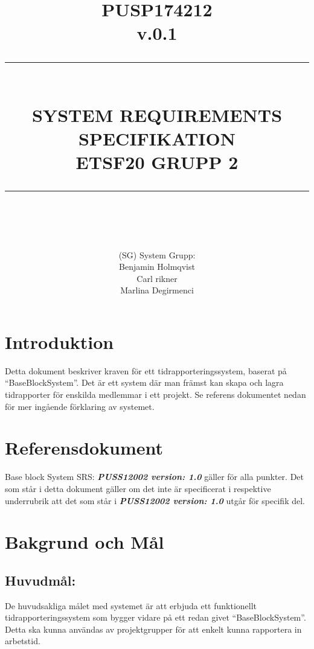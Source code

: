 \documentclass[paper=a4, fontsize=11pt,twoside]{article}
\title{ 														%
		\documentNumber{#1}											%
		\documentVersion{#2}											%
		\HRule{0.5pt} \\ %
		\LARGE \textbf{\uppercase{#3}} \\  									%
		\large \textbf{\uppercase{ETSF20 Grupp 2}}							%
		\HRule{2pt} \\ [0.5cm]      	%
		\normalsize          		%
	}															%
\author{#4}													%
\date{}                                           	%
\newcommand{\HRule}[1]{\rule{\linewidth}{#1}}   							%
\newcommand{\documentNumber}[1]{\centering PUSP1742#1 \\[1.0cm]}	 		%
\newcommand{\documentVersion}[1]{\centering \small{v.#1} \\[1.0cm]}	 		%
\newcommand{\grouptitlepage}[4]{										%
	\title{ 														%
		\documentNumber{#1}											%
		\documentVersion{#2}											%
		\HRule{0.5pt} \\ %
		\LARGE \textbf{\uppercase{#3}} \\  									%
		\large \textbf{\uppercase{ETSF20 Grupp 2}}							%
		\HRule{2pt} \\ [0.5cm]      	%
		\normalsize          		%
	}															%
	\author{#4}													%
	\maketitle														%
	\tableofcontents												%
	\thispagestyle{empty} 											%
	\newpage														%
}																%
\begin{document}
	
	\grouptitlepage
	{12	}
	{0.1}
	{System Requirements Specifikation}
	{(SG) System Grupp: \\ Benjamin Holmqvist \\ Carl rikner \\Marlina Degirmenci}	
	\section{Introduktion}
	Detta dokument beskriver kraven för ett tidrapporteringssystem, baserat på “BaseBlockSystem”. Det är ett system där man främst kan skapa och lagra tidrapporter för enskilda medlemmar i ett projekt. Se referens dokumentet nedan för mer ingående förklaring av systemet.
	\section{Referensdokument}
	Base block System SRS: \textbf{\textit{PUSS12002 version: 1.0}}  gäller för alla punkter. Det som står i detta dokument gäller om det inte är specificerat i respektive underrubrik att det som står i \textbf{\textit{PUSS12002 version: 1.0}}  utgår för specifik del.
	
	\section{Bakgrund och Mål}
	
	\subsection{Huvudmål:}
	De huvudsakliga målet med systemet är att erbjuda ett funktionellt tidrapporteringssystem som bygger vidare på ett redan givet “BaseBlockSystem”. Detta ska kunna användas av projektgrupper för att enkelt kunna rapportera in arbetstid.
\end{document}
